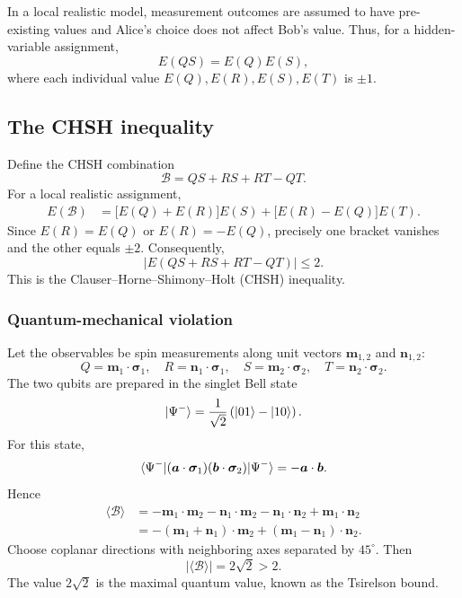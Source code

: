 In a local realistic model, measurement outcomes are assumed to have
pre-existing values and Alice's choice does not affect Bob's value. Thus, for
a hidden-variable assignment,
\begin{equation}
 E(QS)=E(Q)E(S),
\end{equation}
where each individual value $E(Q),E(R),E(S),E(T)$ is $\pm1$. 

\subsection{The CHSH inequality}
Define the CHSH combination
\begin{equation}
 \mathcal{B}=QS+RS+RT-QT.
\end{equation}
For a local realistic assignment,
\begin{align}
 E(\mathcal{B})
 &=\bigl[E(Q)+E(R)\bigr]E(S)
   +\bigl[E(R)-E(Q)\bigr]E(T).
\end{align}
Since $E(R)=E(Q)$ or $E(R)=-E(Q)$, precisely one bracket vanishes and the
other equals $\pm2$. Consequently,
\begin{equation}
 \boxed{|E(QS+RS+RT-QT)|\leq2.}
\end{equation}
This is the Clauser--Horne--Shimony--Holt (CHSH) inequality.

\subsubsection{Quantum-mechanical violation}
Let the observables be spin measurements along unit vectors $\bm m_{1,2}$ and $\bm n_{1,2}$:
\begin{equation}
 Q=\bm m_1\cdot\bm\sigma_1,
 \quad R=\bm n_1\cdot\bm\sigma_1,
 \quad S=\bm m_2\cdot\bm\sigma_2,
 \quad T=\bm n_2\cdot\bm\sigma_2.
\end{equation}
The two qubits are prepared in the singlet Bell state
\begin{equation}
 |{\Psi^-}\rangle=\frac{1}{\sqrt2}\left(|{01}\rangle-|{10}\rangle\right).
\end{equation}
For this state,
\begin{equation}
 \langle{\Psi^-}|(\bm a\cdot\bm\sigma_1)
 (\bm b\cdot\bm\sigma_2)|{\Psi^-}\rangle=-\bm a\cdot\bm b.
\end{equation}
Hence
\begin{align}
 \langle\mathcal{B}\rangle
 &=-\bm m_1\cdot\bm m_2-\bm n_1\cdot\bm m_2
   -\bm n_1\cdot\bm n_2+\bm m_1\cdot\bm n_2\\
 &=-(\bm m_1+\bm n_1)\cdot\bm m_2
   +(\bm m_1-\bm n_1)\cdot\bm n_2.
\end{align}
Choose coplanar directions with neighboring axes separated by $45^\circ$.
Then
\begin{equation}
 |\langle\mathcal{B}\rangle|=2\sqrt2>2.
\end{equation}
The value $2\sqrt2$ is the maximal quantum value, known as the Tsirelson
bound.

